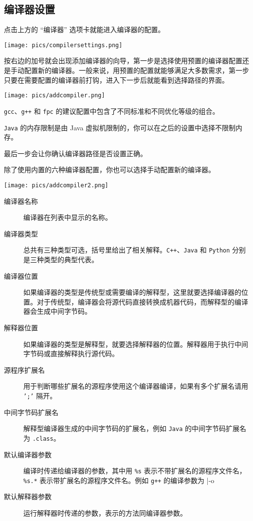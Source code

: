 \documentclass[UTF-8]{ctexart}
\begin{document}
			\subsection{编译器设置}

				点击上方的 “编译器” 选项卡就能进入编译器的配置。

				\begin{center}
					\texttt{[image: pics/compilersettings.png]}
				\end{center}

				按右边的加号就会出现添加编译器的向导，第一步是选择使用预置的编译器配置还是手动配置新的编译器。一般来说，用预置的配置就能够满足大多数需求，第一步只要在需要配置的编译器前打钩，进入下一步后就能看到选择路径的界面。

				\begin{center}
					\texttt{[image: pics/addcompiler.png]}
				\end{center}

				\texttt{gcc}、\texttt{g++} 和 \texttt{fpc} 的建议配置中包含了不同标准和不同优化等级的组合。

				\texttt{Java} 的内存限制是由 Java 虚拟机限制的，你可以在之后的设置中选择不限制内存。

				最后一步会让你确认编译器路径是否设置正确。

				除了使用内置的六种编译器配置，你也可以选择手动配置新的编译器。

				\begin{center}
					\texttt{[image: pics/addcompiler2.png]}
				\end{center}

				\begin{description}
					\item[编译器名称] 编译器在列表中显示的名称。
					\item[编译器类型] 总共有三种类型可选，括号里给出了相关解释。\texttt{C++}、\texttt{Java} 和 \texttt{Python} 分别是三种类型的典型代表。
					\item[编译器位置] 如果编译器的类型是传统型或需要编译的解释型，这里就要选择编译器的位置。对于传统型，编译器会将源代码直接转换成机器代码，而解释型的编译器会生成中间字节码。
					\item[解释器位置] 如果编译器的类型是解释型，就要选择解释器的位置。解释器用于执行中间字节码或直接解释执行源代码。
					\item[源程序扩展名] 用于判断哪些扩展名的源程序使用这个编译器编译，如果有多个扩展名请用 \texttt{';'} 隔开。
					\item[中间字节码扩展名] 解释型编译器生成的中间字节码的扩展名，例如 \texttt{Java} 的中间字节码扩展名为 \texttt{.class}。
					\item[默认编译器参数] 编译时传递给编译器的参数，其中用 \texttt{\%s} 表示不带扩展名的源程序文件名，\texttt{\%s.*} 表示带扩展名的源程序文件名。例如 \texttt{g++} 的编译参数为
						|-o %
					\item[默认解释器参数] 运行解释器时传递的参数，表示的方法同编译器参数。
				\end{description}
\end{document}
